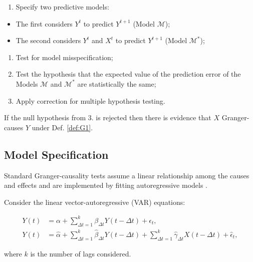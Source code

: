\documentclass[]{book}
\providecommand{\tightlist}{%
  \setlength{\itemsep}{0pt}\setlength{\parskip}{0pt}}
\theoremstyle{definition}
\theoremstyle{definition}
\theoremstyle{definition}
\theoremstyle{remark}
\begin{document}
\begin{enumerate}
\def\labelenumi{\arabic{enumi}.}
\tightlist
\item
  Specify two predictive models:
\end{enumerate}

\begin{itemize}
\tightlist
\item
  The first considers \(Y^t\) to predict \(Y^{t+1}\) (Model
  \(\mathcal{M}\));
\item
  The second considers \(Y^t\) and \(X^t\) to predict \(Y^{t+1}\) (Model
  \(\mathcal{M}^*\));
\end{itemize}

\begin{enumerate}
\def\labelenumi{\arabic{enumi}.}
\setcounter{enumi}{1}
\tightlist
\item
  Test for model misspecification;
\item
  Test the hypothesis that the expected value of the prediction error of
  the Models \(\mathcal{M}\) and \(\mathcal{M}^*\) are statistically the
  same;
\item
  Apply correction for multiple hypothesis testing.
\end{enumerate}

If the null hypothesis from 3. is rejected then there is evidence that
\(X\) Granger-causes \(Y\) under Def. \ref{def:G1}.

\subsection{Model Specification}\label{model-specification}

Standard Granger-causality tests assume a linear relationship among the
causes and effects and are implemented by fitting autoregressive models
\citep{Wiener56, granger:econ}.

Consider the linear vector-autoregressive (VAR) equations:

\begin{align}
Y(t) &= {\alpha} + \sum^k_{\Delta t=1}{{\beta}_{\Delta t} Y(t-\Delta t)} + \epsilon_t, \label{eq:AR11}\\
Y(t) &= \widehat{\alpha} + \sum^k_{\Delta t=1}{{\widehat{\beta}}_{\Delta t} Y(t-\Delta t)} +  \sum^k_{\Delta t=1}{{\widehat{\gamma}}_{\Delta t}X(t-\Delta t)}+ \widehat{\epsilon}_t, \label{eq:AR22}
\end{align}

where \(k\) is the number of lags considered.
\end{document}
